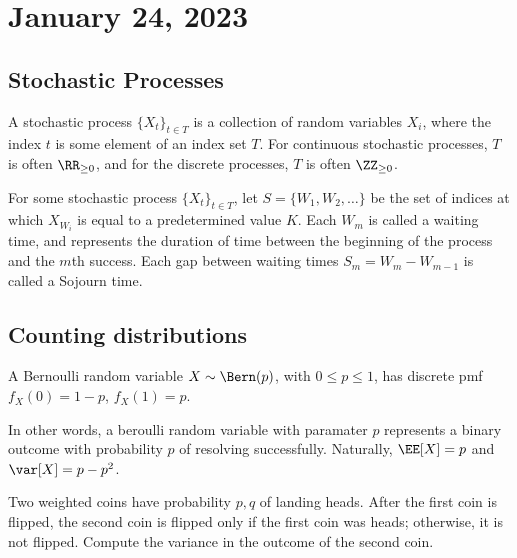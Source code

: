 \section{January 24, 2023}

\subsection{Stochastic Processes}

\begin{definition}

A \ac{stochastic process} $\{X_t\}_{t\in T}$ is a collection of random variables $X_i$, where the index $t$ is some element of an index set $T$. For continuous stochastic processes, $T$ is often $\RR_{\geq 0}$, and for the discrete processes, $T$ is often $\ZZ_{\geq 0}$. 
\end{definition}

\begin{definition}

For some stochastic process $\{X_t\}_{t\in T}$, let $S=\{W_1, W_2, \hdots\}$ be the set of indices at which $X_{W_i}$ is equal to a predetermined value $K$. Each $W_m$ is called a \ac{waiting time}, and represents the duration of time between the beginning of the process and the $m$th success. Each gap between waiting times $S_m = W_m - W_{m-1}$ is called a \ac{Sojourn time}. 
\end{definition}

\subsection{Counting distributions}

\begin{definition}

A \ac{Bernoulli random variable} $X\sim \Bern(p)$, with $0\leq p\leq 1$, has discrete pmf $f_X(0) = 1-p$, $f_X(1) = p$. 
\end{definition}

In other words, a beroulli random variable with paramater $p$ represents a binary outcome with probability $p$ of resolving successfully. Naturally, $\EE[X] = p$ and $\var[X]=p-p^2$.

\begin{example}
\exlabel

Two weighted coins have probability $p,q$ of landing heads. After the first coin is flipped, the second coin is flipped only if the first coin was heads; otherwise, it is not flipped. Compute the variance in the outcome of the second coin. 
\end{example}


